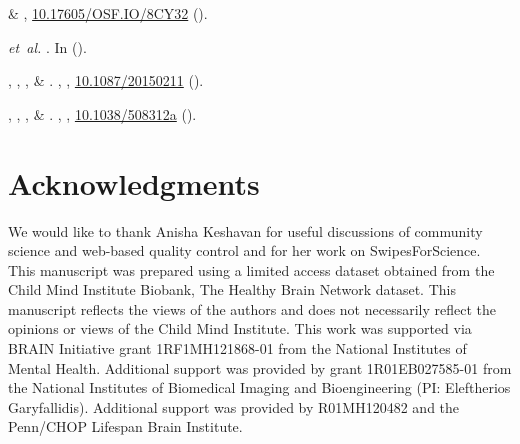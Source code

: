 \documentclass[fleqn,10pt,inline]{wlscirep}
\begin{document}
\begin{thebibliography}{100}
 \& 
\newblock {}, \url{10.17605/OSF.IO/8CY32}
    ().

 \emph{et~al.}
\newblock {}.
\newblock In \emph{} ().

, ,
    ,  \&
\newblock {}.
    \textbf{}, ,
    \url{10.1087/20150211} ().

, ,
    ,  \&
\newblock {}.
 \textbf{},
    , \url{10.1038/508312a} ().

\end{thebibliography}


\section*{Acknowledgments}

We would like to thank Anisha Keshavan for useful discussions of community
science and web-based quality control and for her work on SwipesForScience. This
manuscript was prepared using a limited access dataset obtained from the Child
Mind Institute Biobank, The Healthy Brain Network dataset. This manuscript
reflects the views of the authors and does not necessarily reflect the opinions
or views of the Child Mind Institute. This work was supported via BRAIN Initiative grant 1RF1MH121868-01 from the National Institutes of Mental Health. Additional support was provided by grant 1R01EB027585-01 from the National Institutes of Biomedical Imaging and Bioengineering (PI: Eleftherios Garyfallidis). Additional support was provided by R01MH120482 and the Penn/CHOP Lifespan Brain Institute. 
\end{document}
